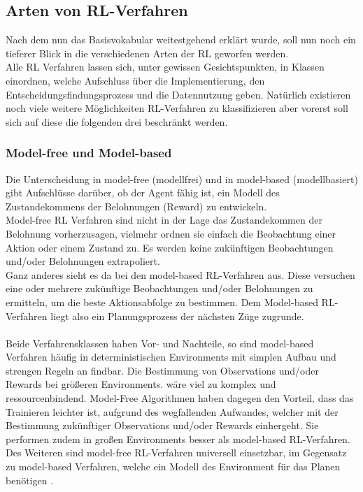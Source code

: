 \subsection{Arten von RL-Verfahren}
Nach dem nun das Basisvokabular weitestgehend erklärt wurde, soll nun noch ein tieferer Blick in die verschiedenen Arten der RL geworfen werden.\\
Alle RL Verfahren lassen sich, unter gewissen Gesichtspunkten, in Klassen einordnen, welche Aufschluss über die Implementierung, den Entscheidungsfindungsprozess und die Datennutzung geben. 
Natürlich existieren noch viele weitere Möglichkeiten RL-Verfahren zu klassifizieren aber vorerst soll sich auf diese die folgenden drei beschränkt werden.

\subsubsection{Model-free und Model-based}
Die Unterscheidung in model-free (modellfrei) und in model-based (modellbasiert) gibt Aufschlüsse darüber, ob der Agent fähig ist, ein Modell des Zustandekommens der Belohnungen (Reward) zu entwickeln.\\
Model-free RL Verfahren sind nicht in der Lage das Zustandekommen der Belohnung vorherzusagen, vielmehr ordnen sie einfach die Beobachtung einer Aktion oder einem Zustand zu. Es werden keine zukünftigen Beobachtungen und/oder Belohnungen extrapoliert. 
\cite[S. 303 ff. / S. 100 ]{Sutton1998, DRL_Lapan}\\
Ganz anderes sieht es da bei den model-based RL-Verfahren aus. Diese versuchen eine oder mehrere zukünftige Beobachtungen und/oder Belohnungen zu ermitteln, um die beste Aktionsabfolge zu bestimmen. Dem Model-based RL-Verfahren liegt also ein Planungsprozess der nächsten Züge zugrunde. \cite[S. 303 ff.]{Sutton1998}\\
\\Beide Verfahrensklassen haben Vor- und Nachteile, so sind model-based Verfahren häufig in deterministischen Environments mit simplen Aufbau und strengen Regeln an findbar. Die Bestimmung von Observations und/oder Rewards bei größeren Environments. wäre viel zu komplex und ressourcenbindend. Model-Free Algorithmen haben dagegen den Vorteil, dass das Trainieren leichter ist, aufgrund des wegfallenden Aufwandes, welcher mit der Bestimmung zukünftiger Observations und/oder Rewards einhergeht. Sie performen zudem in großen Environments besser als model-based RL-Verfahren. Des Weiteren sind model-free RL-Verfahren universell einsetzbar, im Gegensatz zu model-based Verfahren, welche ein Modell des Environment für das Planen benötigen \cite[S. 100 ff.]{DRL_Lapan}.

